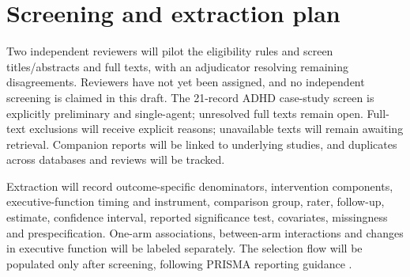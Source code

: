 \section{Screening and extraction plan}
Two independent reviewers will pilot the eligibility rules and screen titles/abstracts and full texts, with an adjudicator resolving remaining disagreements.
Reviewers have not yet been assigned, and no independent screening is claimed in this draft.
The 21-record ADHD case-study screen is explicitly preliminary and single-agent; unresolved full texts remain open.
Full-text exclusions will receive explicit reasons; unavailable texts will remain awaiting retrieval.
Companion reports will be linked to underlying studies, and duplicates across databases and reviews will be tracked.

Extraction will record outcome-specific denominators, intervention components, executive-function timing and instrument, comparison group, rater, follow-up, estimate, confidence interval, reported significance test, covariates, missingness and prespecification.
One-arm associations, between-arm interactions and changes in executive function will be labeled separately.
The selection flow will be populated only after screening, following PRISMA reporting guidance \citep{Page2021}.
